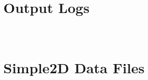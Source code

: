 \documentclass[a4paper,titlepage]{article}
\begin{document}
\begin{appendices}
		\begin{center}
			\inputminted{python}{../conjugate_gradient.py}
			\label{lst:conjugate_gradient}
		\end{center}
	
		\section{Output Logs} \label{appendix:logs}
		
		\begin{center}
			\inputminted{pycon}{logs/q1.txt}
			\label{lst:q1_log}
		\end{center}
	
		\begin{center}
			\inputminted{pycon}{logs/q2.txt}
			\label{lst:q2_log}
		\end{center}
	
		\begin{center}
			\inputminted{pycon}{logs/q3.txt}
			\label{lst:q3_log}
		\end{center}
	
		\section{Simple2D Data Files} \label{appendix:simple2d}	
		\begin{center}
			\inputminted{pycon}{../simple2d/mesh.dat}
			\label{lst:mesh}
		\end{center}
		
		\begin{center}
			\inputminted{pycon}{../simple2d/result.dat}
			\label{lst:result}
		\end{center}

	\end{appendices}
\end{document}
